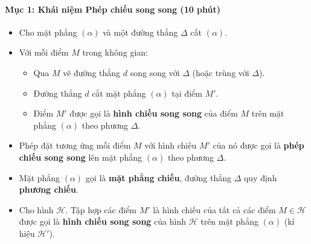 \documentclass[12pt, a4paper]{article}
\begin{document}
\paragraph{Mục 1: Khái niệm Phép chiếu song song (10 phút)}
\begin{itemize}
    \item Cho mặt phẳng $(\alpha)$ và một đường thẳng $\Delta$ cắt $(\alpha)$.
    \item Với mỗi điểm $M$ trong không gian:
    \begin{itemize}
        \item Qua $M$ vẽ đường thẳng $d$ song song với $\Delta$ (hoặc trùng với $\Delta$).
        \item Đường thẳng $d$ cắt mặt phẳng $(\alpha)$ tại điểm $M'$.
        \item Điểm $M'$ được gọi là \textbf{hình chiếu song song} của điểm $M$ trên mặt phẳng $(\alpha)$ theo phương $\Delta$.
    \end{itemize}
    \item Phép đặt tương ứng mỗi điểm $M$ với hình chiếu $M'$ của nó được gọi là \textbf{phép chiếu song song} lên mặt phẳng $(\alpha)$ theo phương $\Delta$.
    \item Mặt phẳng $(\alpha)$ gọi là \textbf{mặt phẳng chiếu}, đường thẳng $\Delta$ quy định \textbf{phương chiếu}.
    \item Cho hình $\mathscr{H}$. Tập hợp các điểm $M'$ là hình chiếu của tất cả các điểm $M \in \mathscr{H}$ được gọi là \textbf{hình chiếu song song} của hình $\mathscr{H}$ trên mặt phẳng $(\alpha)$ (kí hiệu $\mathscr{H}'$).
\end{itemize}

\begin{center}
\end{center}
\end{document}
